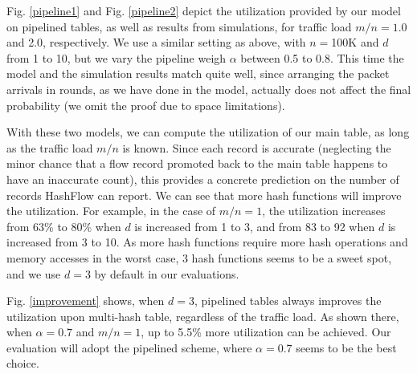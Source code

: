 Fig. \ref{pipeline1} and Fig. \ref{pipeline2} depict the utilization provided by our model on pipelined tables, 
as well as results from simulations, for traffic load $m/n=1.0$ and 2.0, respectively. 
We use a similar setting as above, with $n=$100K and $d$ from 1 to 10,
but we vary the pipeline weigh $\alpha$ between 0.5 to 0.8. 
This time the model and the simulation results match  quite well, 
since  arranging the packet arrivals in rounds, as we have done in the model,  
actually does not affect the final probability (we omit the proof due to space limitations).

With these two models, we can compute the utilization of our main table, 
as long as the traffic load $m/n$ is known. Since each record is accurate 
(neglecting the minor chance that a flow record promoted back to the main 
table happens to have an inaccurate count), this provides a concrete prediction 
on the number of records HashFlow can report. 
We can see that more hash functions will improve the utilization.
For example, in the case of $m/n=1$, the utilization  increases from 63\% to 80\% 
when $d$ is increased from 1 to 3, and from 83 to 92 when $d$ is increased from 3 to 10.
As more hash functions require more hash operations and memory accesses in the worst case, 3 hash functions seems to be a  sweet spot, and we use $d=3$ by default in our evaluations.

Fig. \ref{improvement} shows, when $d=3$, 
pipelined tables always improves the utilization upon  multi-hash table, regardless of the traffic load.
As shown there, when $\alpha=0.7$ and $m/n=1$, up to 5.5\% more utilization can be achieved.
Our evaluation will adopt the pipelined scheme, where $\alpha=0.7$ seems to be the best choice.

